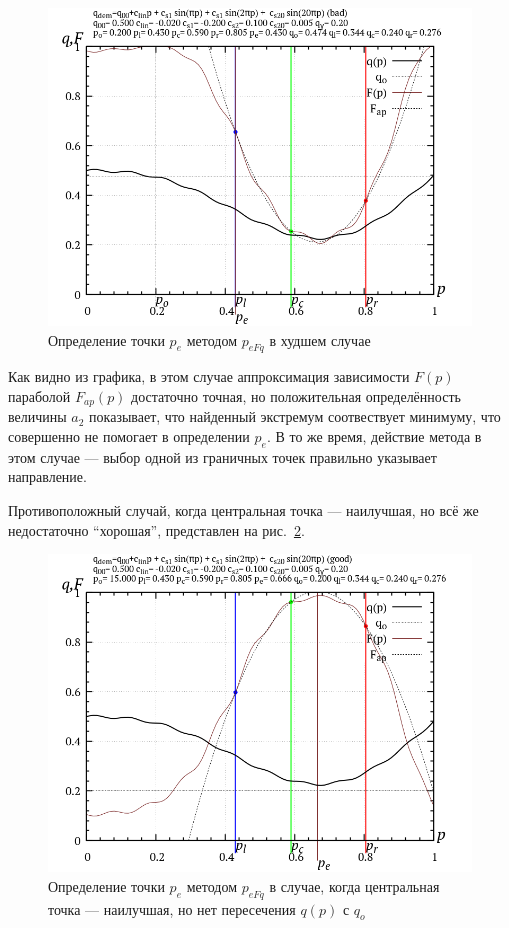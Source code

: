 \begin{figure}[htb!]
  \centerline{\includegraphics[width=60\TW]{p/p_eFq/q_p_eFq_bad.png}}
  \caption{Определение точки $p_e$ методом $p_{eFq}$ в худшем случае}
  \label{atu:f:p_eFq_bad}
\end{figure}

Как видно из графика, в этом случае аппроксимация зависимости $F(p)$
параболой $F_{ap}(p)$ достаточно точная, но положительная определённость величины
$a_2$ показывает, что найденный экстремум соотвествует минимуму,
что совершенно не помогает в определении $p_e$. В то же время,
действие метода в этом случае --- выбор одной из граничных точек
правильно указывает направление.

Противоположный случай, когда центральная точка --- наилучшая,
но всё же недостаточно ``хорошая'', представлен на рис.~\ref{atu:f:p_eFq_good}.

\begin{figure}[htb!]
  \centerline{\includegraphics[width=60\TW]{p/p_eFq/q_p_eFq_good.png}}
  \caption{Определение точки $p_e$ методом $p_{eFq}$ в случае, когда центральная точка --- наилучшая, но нет пересечения $q(p)$ с $q_o$ }
  \label{atu:f:p_eFq_good}
\end{figure}

